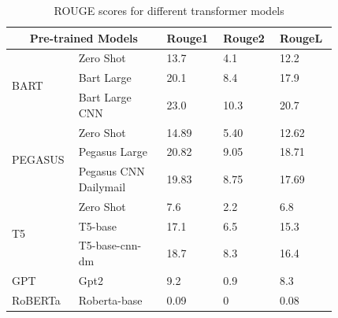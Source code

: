\documentclass{article}
\begin{document}
\begin{table}
\caption{ROUGE scores for different transformer models }
\renewcommand{\arraystretch}{1.5}
	\centering
	\begin{tabular}{p{0.12\linewidth} | p{0.25\linewidth} | p{0.15\linewidth} |p{0.15\linewidth}|p{0.15\linewidth}}
		\hline
		\multicolumn{2}{c|}{\textbf{Pre-trained Models}} & \textbf{Rouge1} & \textbf{Rouge2} & \textbf{RougeL} \\
		\hline
		\multirow{3}{4em}{BART} & Zero Shot & 13.7 & 4.1 & 12.2 \\
        & Bart Large  & 20.1 & 8.4 & 17.9 \\
        & Bart Large CNN  & 23.0 & 10.3 & 20.7 \\ 
		\hline
		\multirow{3}{4em}{PEGASUS} & Zero Shot & 14.89 & 5.40 & 12.62\\
        & Pegasus Large  & 20.82 & 9.05 & 18.71  \\
        & Pegasus CNN Dailymail & 19.83 & 8.75 & 17.69\\ 
		\hline
		\multirow{3}{4em}{T5} & Zero Shot & 7.6 & 2.2 & 6.8\\
        & T5-base  & 17.1 & 6.5 &  15.3 \\
        & T5-base-cnn-dm & 18.7 & 8.3 & 16.4\\ 
		\hline
		\multirow{1}{4em}{GPT} & Gpt2 & 9.2 & 0.9 & 8.3\\
		\hline
		\multirow{1}{4em}{RoBERTa} & Roberta-base & 0.09 & 0 & 0.08 \\
		\hline
	\end{tabular}
\end{table}
\end{document}
